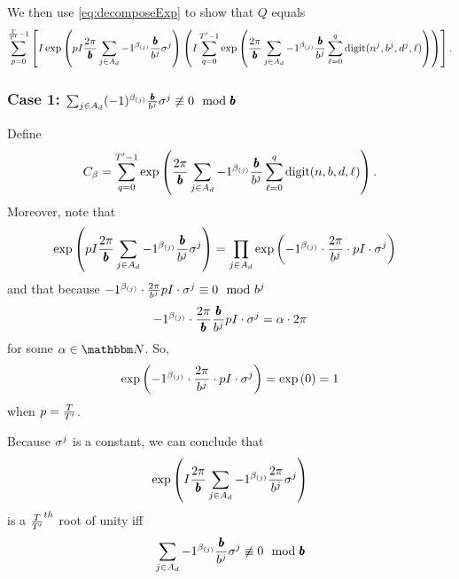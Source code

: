 
We then use \eqref{eq:decomposeExp} to show that $Q$ equals
\begin{equation}
\label{eq:inner-outer-split}
  \sum_{p= 0}^{\frac{T}{{T}'} - 1} \left[
    I \exp\left(
      pI \frac{2\pi}{{\pmb{b}}} \sum_{j \in A_d} -1 ^ {\beta_{(j)}}
      \frac{{\pmb{b}}}{b^j}
      \sigma^j
    \right)
  \left(
  I \sum_{q = 0}^{{T}' - 1}
    \exp\left(
        \frac{2\pi}{{\pmb{b}}}
        \sum_{j \in A_d} -1 ^ {\beta_{(j)}} \frac{{\pmb{b}}}{b^j}
          \sum_{\ell = 0}^{q}\mathrm{digit}(n^j, b^j, d^j, \ell)
    \right)\right)\right].
\end{equation}

\subsubsection*{Case 1: $\sum_{j \in A_d} (-1) ^ {\beta_{(j)}} \frac{{\pmb{b}}}{b^j} \sigma^j \not\equiv 0 \mod {{\pmb{b}}}$}
Define
$$
  C_\beta = \sum_{q = 0}^{{T}' - 1}
  \exp\left(
      \frac{2\pi}{{\pmb{b}}}
      \sum_{j \in A_d} -1 ^ {\beta_{(j)}} \frac{{\pmb{b}}}{b^j}
        \sum_{\ell = 0}^{q}\mathrm{digit}(n, b, d, \ell)
  \right).
$$
Moreover, note that 
\begin{align*}
  &\exp\left(
      pI \frac{2\pi}{{\pmb{b}}} \sum_{j \in A_d} -1 ^ {\beta_{(j)}}
      \frac{{\pmb{b}}}{b^j}
      \sigma^j
    \right)
  = \prod_{j \in A_d} \exp\left(
      -1^{\beta_{(j)}}
     \cdot
    	\frac{2\pi}{b^j}
     \cdot
      pI \cdot \sigma^j 
    \right)
\end{align*}
and that  because $-1^{\beta_{(j)}} \cdot \frac{2\pi}{b^j} pI \cdot \sigma^j \equiv 0 \mod b^j$
\begin{equation*}
   -1^{\beta_{(j)}} \cdot \frac{2\pi}{{\pmb{b}}} \frac{{\pmb{b}}}{b^j} pI \cdot \sigma^j = \alpha \cdot 2\pi
\end{equation*}
for some $\alpha \in \N$. So,
\begin{equation*}
  \exp\left(-1^{\beta_{(j)}} \cdot\frac{2\pi}{b^j} \cdot pI \cdot \sigma^j \right) = \exp\left(0\right) = 1
\end{equation*}
when $p = \frac{T}{{T}'}$. 

Because $\sigma^j$ is a constant, we can conclude that
\begin{equation*}
 \exp\left(
      I \frac{2\pi}{{\pmb{b}}} \sum_{j \in A_d} -1 ^ {\beta_{(j)}}
      \frac{2\pi}{b^j}
      \sigma^j
    \right) 
\end{equation*}
is a $\frac{T}{{T}'}^{th}$ root of unity iff
$$\sum_{j \in A_d} -1 ^ {\beta_{(j)}}
      \frac{{\pmb{b}}}{b^j}
      \sigma^j \not\equiv 0 \mod {{\pmb{b}}}
$$

